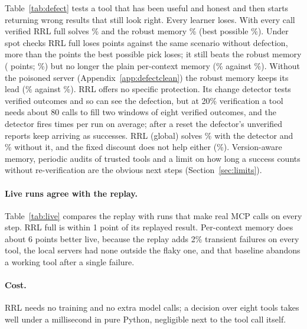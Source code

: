 \documentclass[11pt]{article}
\begin{document}
Table~\ref{tab:defect} tests a tool that has been useful and honest and then starts returning
wrong results that still look right. Every learner loses. With every call verified RRL full
solves \MdefRRL\% and the robust memory \MdefRobust\% (best possible \MdefOracle\%). Under spot
checks RRL full loses \MdefSpotDrop{} points against the same scenario without defection, more than
the \MdefOracleDrop{} points the best possible pick loses; it still beats the robust memory
(\MdefSpotVsRobust{} points; \MdefSpotRobust\%) but no longer the plain per-context memory
(\MdefSpotMemory\% against \MdefSpotRRL\%). Without the poisoned server
(Appendix~\ref{app:defectclean}) the robust memory keeps its lead (\McleanDefSpotRobust\% against
\McleanDefSpotRRL\%). RRL offers no specific protection. Its change detector tests verified
outcomes and so can see the defection, but at 20\% verification a tool needs about 80 calls to
fill two windows of eight verified outcomes, and the detector fires \MdefSpotResets{} times per
run on average; after a reset the defector's unverified reports keep arriving as successes.
RRL (global) solves \MdefSpotCd\% with the detector and \MdefSpotNocd\% without it, and the fixed
discount does not help either (\MdefSpotFixed\%). Version-aware memory, periodic audits of
trusted tools and a limit on how long a success counts without re-verification are the obvious
next steps (Section~\ref{sec:limits}).

\paragraph{Live runs agree with the replay.} Table~\ref{tab:live} compares the replay with runs
that make real MCP calls on every step. RRL full is within 1 point of its replayed result.
Per-context memory does about 6 points better live, because the replay adds 2\% transient
failures on every tool, the local servers had none outside the flaky one, and that baseline
abandons a working tool after a single failure.



\paragraph{Cost.} RRL needs no training and no extra model calls; a decision over eight tools
takes well under a millisecond in pure Python, negligible next to the tool call itself.
\end{document}
